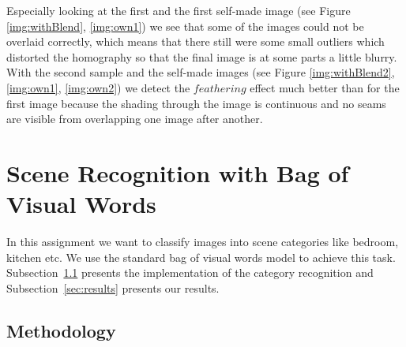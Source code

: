\documentclass[subfigure,epsfig,fleqn,float,numbers=noenddot]{scrartcl}
\begin{document}
Especially looking at the first and the first self-made image (see Figure \ref{img:withBlend}, \ref{img:own1}) we see that some of the images could not be overlaid correctly, which means that there still were some small outliers which distorted the homography so that the final image is at some parts a little blurry. 
With the second sample and the self-made images (see Figure \ref{img:withBlend2}, \ref{img:own1}, \ref{img:own2}) we detect the $feathering$ effect much better than for the first image because the shading through the image is continuous and no seams are visible from overlapping one image after another. 


\section{Scene Recognition with Bag of Visual Words}
\label{sec:2}

In this assignment we want to classify images into scene categories like bedroom, kitchen etc. 
We use the standard bag of visual words model to achieve this task. Subsection~\ref{sec:methodology} presents the implementation of the category recognition and Subsection~\ref{sec:results} presents our results.

\subsection{Methodology}
\label{sec:methodology}
\end{document}
